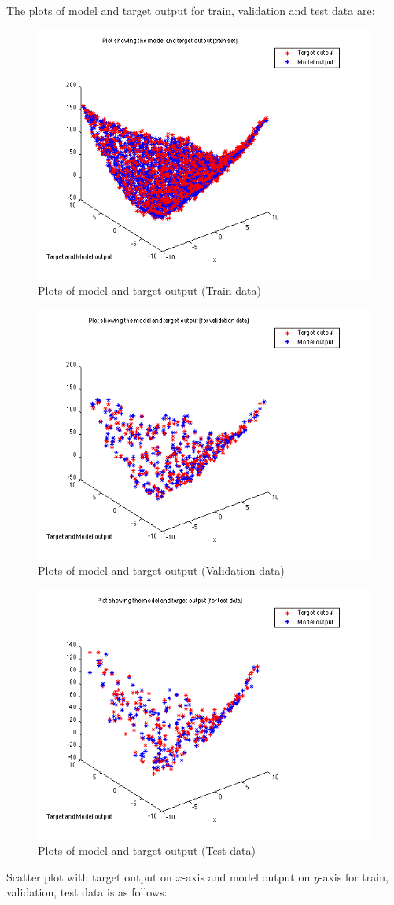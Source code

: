 \documentclass{article}
\begin{document}
The plots of model and target output for train, validation and test data are:

\begin{figure}[H]
\centering
\includegraphics[width=0.5\linewidth]{Regression/rbfnn_bivariate/output_train.png}
\caption{Plots of model and target output (Train data)}
\end{figure}

\begin{figure}[H]
\centering
\includegraphics[width=0.5\linewidth]{Regression/rbfnn_bivariate/output_val.png}
\caption{Plots of model and target output (Validation data)}
\end{figure}

\begin{figure}[H]
\centering
\includegraphics[width=0.5\linewidth]{Regression/rbfnn_bivariate/output_test.png}
\caption{Plots of model and target output (Test data)}
\end{figure}

Scatter plot with target output on $x$-axis and model output on $y$-axis for train, validation, test data is as follows:
\end{document}
